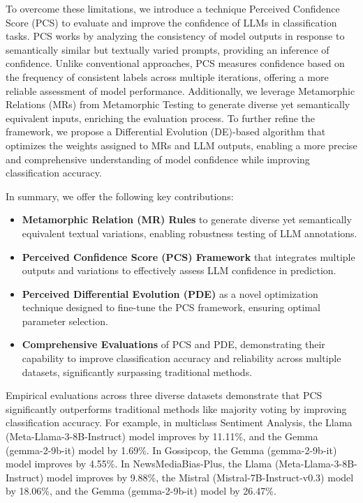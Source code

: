 To overcome these limitations, we introduce a technique Perceived Confidence Score (PCS) to evaluate and improve the confidence of LLMs in classification tasks. PCS works by analyzing the consistency of model outputs in response to semantically similar but textually varied prompts, providing an inference of confidence. Unlike conventional approaches, PCS measures confidence based on the frequency of consistent labels across multiple iterations, offering a more reliable assessment of model performance. Additionally, we leverage Metamorphic Relations (MRs) from Metamorphic Testing \cite{10336270,chen2021metamorphic} to generate diverse yet semantically equivalent inputs, enriching the evaluation process. To further refine the framework, we propose a Differential Evolution (DE)-based  \cite{storn1997differential} algorithm that optimizes the weights assigned to MRs and LLM outputs, enabling a more precise and comprehensive understanding of model confidence while improving classification accuracy.

In summary, we offer the following key contributions:

\begin{itemize}[itemsep=0pt]
    \item \textbf{Metamorphic Relation (MR) Rules} to generate diverse yet semantically equivalent textual variations, enabling robustness testing of LLM annotations.
    
    \item \textbf{Perceived Confidence Score (PCS) Framework} that integrates multiple outputs and variations to effectively assess LLM confidence in prediction.
    
    \item \textbf{Perceived Differential Evolution (PDE)} as a novel optimization technique designed to fine-tune the PCS framework, ensuring optimal parameter selection.
    
    \item \textbf{Comprehensive Evaluations} of PCS and PDE, demonstrating their capability to improve classification accuracy and reliability across multiple datasets, significantly surpassing traditional methods.
\end{itemize}


Empirical evaluations across three diverse datasets demonstrate that PCS significantly outperforms traditional methods like majority voting by improving classification accuracy. For example, in multiclass Sentiment Analysis, the Llama (Meta-Llama-3-8B-Instruct) model improves by 11.11\%, and the Gemma (gemma-2-9b-it) model by 1.69\%. In Gossipcop, the  Gemma (gemma-2-9b-it) model improves by 4.55\%.  In NewsMediaBias-Plus, the Llama (Meta-Llama-3-8B-Instruct) model improves by 9.88\%, the Mistral (Mistral-7B-Instruct-v0.3) model by 18.06\%, and the  Gemma (gemma-2-9b-it) model by 26.47\%. %
